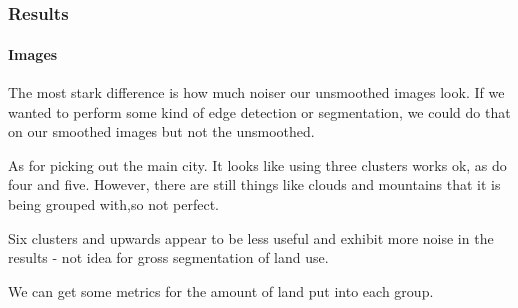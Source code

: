 \documentclass[11pt]{article}
\begin{document}
    \begin{center}
    \end{center}
    { \hspace*{\fill} \\}
    
    \begin{center}
    \end{center}
    { \hspace*{\fill} \\}
    
    \begin{center}
    \end{center}
    { \hspace*{\fill} \\}
    
    \begin{center}
    \end{center}
    { \hspace*{\fill} \\}
    
    \subsubsection{Results}\label{results}

\paragraph{Images}\label{images}

The most stark difference is how much noiser our unsmoothed images look.
If we wanted to perform some kind of edge detection or segmentation, we
could do that on our smoothed images but not the unsmoothed.

As for picking out the main city. It looks like using three clusters
works ok, as do four and five. However, there are still things like
clouds and mountains that it is being grouped with,so not perfect.

Six clusters and upwards appear to be less useful and exhibit more noise
in the results - not idea for gross segmentation of land use.

We can get some metrics for the amount of land put into each group.
\end{document}
